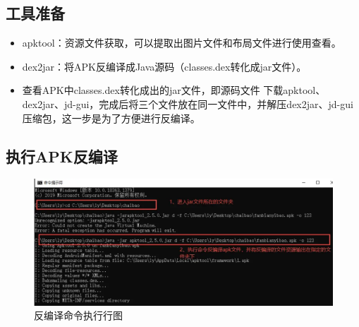 \subsection{工具准备}
\begin{itemize}
    \item apktool：资源文件获取，可以提取出图片文件和布局文件进行使用查看。
    \item dex2jar：将APK反编译成Java源码（classes.dex转化成jar文件）。
    \item 查看APK中classes.dex转化成出的jar文件，即源码文件 下载apktool、dex2jar、jd-gui，完成后将三个文件放在同一文件中，并解压dex2jar、jd-gui压缩包，这一步是为了方便进行反编译。
\end{itemize}

\subsection{执行APK反编译}
\begin{figure}
    \centering
    \includegraphics[scale=0.5]{resources/img/i19.png}
    \caption{反编译命令执行行图}
  \end{figure}

